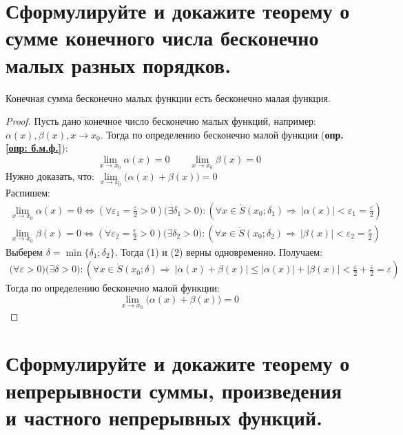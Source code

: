 \newpage
\section{Сформулируйте и докажите теорему о сумме конечного числа бесконечно малых разных порядков.}

\begin{theorem} 
  Конечная сумма бесконечно малых функции есть бесконечно малая функция.
\end{theorem}
\begin{proof}
  Пусть дано конечное число бесконечно малых функций, например: $\alpha(x), \beta(x), x\to x_0$.
  Тогда по определению бесконечно малой функции (\textbf{опр.\ref{опр: б.м.ф.}}): 
  \[
  \lim_{x \to x_0} \alpha(x) = 0 \qquad \lim_{x \to x_0} \beta(x) = 0
  \]
  Нужно доказать, что: $\lim\limits_{x \to x_0} \big(\alpha(x) + \beta(x)\big) = 0$ \\
  Распишем: 
  \begin{gather*}
    \lim_{x \to x_0} \alpha(x) = 0 \iff \left(\forall \varepsilon_1 = \frac{\varepsilon}{2} > 0\right)\big(\exists \delta_1 > 0\big)\colon \left(\forall x \in \mathring{S}(x_0; \delta_1) \Rightarrow\ |\alpha(x)| < \varepsilon_1 = \frac{\varepsilon}{2}\right) \tag{1}\\
    \lim_{x \to x_0} \beta(x) = 0 \iff \left(\forall \varepsilon_2 = \frac{\varepsilon}{2} > 0\right)\big(\exists \delta_2 > 0\big)\colon \left(\forall x \in \mathring{S}(x_0; \delta_2) \Rightarrow\ |\beta(x)| <  \varepsilon_2 = \frac{\varepsilon}{2}\right) \tag{2}
  \end{gather*}
  Выберем $\delta = \min \{\delta_1; \delta_2\}$. Тогда (1) и (2) верны одновременно. Получаем:
  \begin{gather*}
    \big(\forall \varepsilon > 0\big)\big(\exists \delta > 0\big)\colon \left(\forall x \in \mathring{S}(x_0; \delta) \Rightarrow\ |\alpha(x) + \beta(x)| \le |\alpha(x)| + |\beta(x)| < \frac{\varepsilon}{2} + \frac{\varepsilon}{2} = \varepsilon\right) 
  \end{gather*}
  Тогда по определению бесконечно малой функции:
  \[
  \lim_{x \to x_0} \big(\alpha(x) + \beta(x)\big) = 0
  \] 
\end{proof}

\section{Сформулируйте и докажите теорему о непрерывности суммы, произведения и частного непрерывных функций.}


